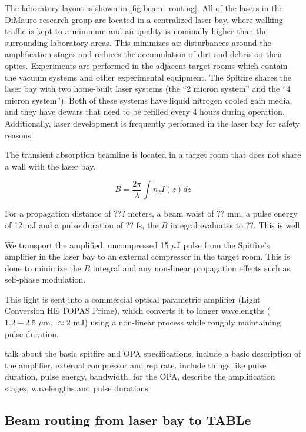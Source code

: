 The laboratory layout is shown in \cref{fig:beam_routing}. All of the lasers in the DiMauro research group are located in a centralized laser bay, where walking traffic is kept to a minimum and air quality is nominally higher than the surrounding laboratory areas. This minimizes air disturbances around the amplification stages and reduces the accumulation of dirt and debris on their optics. Experiments are performed in the adjacent target rooms which contain the vacuum systems and other experimental equipment. The Spitfire shares the laser bay with two home-built laser systems (the ``2 micron system'' and the ``4 micron system''). Both of these systems have liquid nitrogen cooled gain media, and they have dewars that need to be refilled every 4 hours during operation. Additionally, laser development is frequently performed in the laser bay for safety reasons.

The transient absorption beamline is located in a target room that does not share a wall with the laser bay.

\begin{equation}
B = \frac{2 \pi}{\lambda} \int n_2 I(z) dz
\end{equation}

For a propagation distance of ??? meters, a beam waist of ?? mm, a pulse energy of 12 mJ and a pulse duration of ?? fs, the $B$ integral evaluates to ??. This is well 


We transport the amplified, uncompressed 15 $\mu$J pulse from the Spitfire's amplifier in the laser bay to an external compressor in the target room. This is done to minimize the $B$ integral and any non-linear propagation effects such as self-phase modulation.


This light is sent into a commercial optical parametric amplifier (Light Conversion HE TOPAS Prime), which converts it to longer wavelengths ($1.2 - 2.5$ $\mu$m, $\approx2$ mJ) using a non-linear process while roughly maintaining pulse duration.


talk about the basic spitfire and OPA specifications. include a basic description of the amplifier, external compressor and rep rate. include things like pulse duration, pulse energy, bandwidth. for the OPA, describe the amplification stages, wavelengths and pulse durations.

\subsection{Beam routing from laser bay to TABLe}



